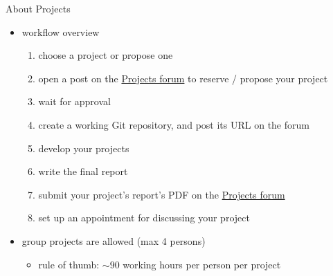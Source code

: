 \documentclass[presentation]{beamer}\mode<presentation>{\usetheme{AMSBolognaFC}}
\begin{document}
\begin{frame}[c]{About Projects}
    \begin{itemize}


        \item workflow overview
        \begin{enumerate}
            \item \alert{choose} a project or \alert{propose} one
            \item open a post on the \href{\projectsForum}{Projects forum} to reserve / propose your project
            \item wait for approval
            \item create a working Git repository, and post its URL on the forum
            \item develop your projects
            \item write the \alert{final report}
            \item submit your project's \alert{report}'s PDF on the \href{\projectsForum}{Projects forum}
            \item set up an appointment for discussing your project
        \end{enumerate}

        \vfill

        \item group projects are allowed (max 4 persons)
        \begin{itemize}
            \item rule of thumb: $\sim90$ working hours per person per project
        \end{itemize}
    \end{itemize}
\end{frame}
\end{document}
